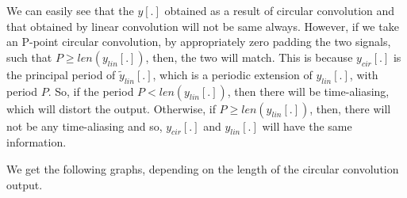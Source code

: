 \documentclass[12pt, a4paper, twoside]{article}
\begin{document}
We can easily see that the $y[.]$ obtained as a result of circular convolution and that obtained by linear convolution will not be same always. However, if we take an P-point circular convolution, by appropriately zero padding the two signals, such that $P \geq len(y_{lin}[.])$, then, the two will match. This is because $y_{cir}[.]$ is the principal period of $\tilde{y}_{lin}[.]$, which is a periodic extension of $y_{lin}[.]$, with period $P$. So, if the period $P < len(y_{lin}[.])$, then there will be time-aliasing, which will distort the output. Otherwise, if $P \geq len(y_{lin}[.])$, then, there will not be any time-aliasing and so, $y_{cir}[.]$ and $y_{lin}[.]$ will have the same information.

We get the following graphs, depending on the length of the circular convolution output.
\end{document}
